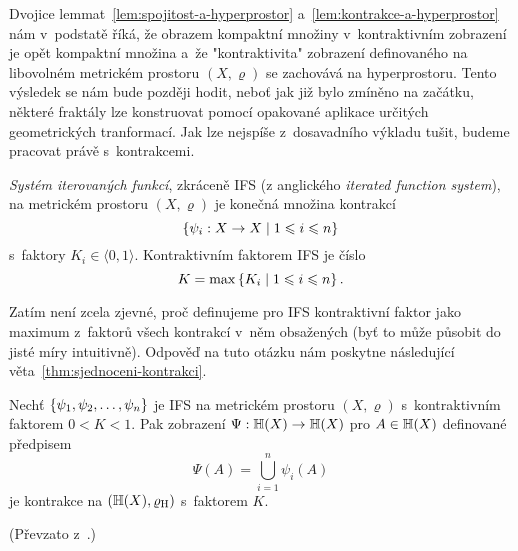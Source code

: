 Dvojice lemmat~\ref{lem:spojitost-a-hyperprostor} a~\ref{lem:kontrakce-a-hyperprostor} nám v~podstatě říká, že obrazem kompaktní množiny v~kontraktivním zobrazení je opět kompaktní množina a~že "kontraktivita" zobrazení definovaného na libovolném metrickém prostoru $(X,\varrho)$ se zachovává na hyperprostoru. Tento výsledek se nám bude později hodit, neboť jak již bylo zmíněno na začátku, některé fraktály lze konstruovat pomocí opakované aplikace určitých geometrických tranformací. Jak lze nejspíše z~dosavadního výkladu tušit, budeme pracovat právě s~kontrakcemi.
\begin{definition}\label{def:system-iterovanych-funkci}
    \emph{Systém iterovaných funkcí}, zkráceně IFS (z anglického \emph{iterated function system}), na metrickém prostoru $(X,\varrho)$ je konečná množina kontrakcí
    \[\left\{\psi_i:X \rightarrow X\mid 1\leqslant i\leqslant n\right\}\]
    s~faktory $K_i\in\langle 0,1\rangle$. Kontraktivním faktorem IFS je číslo
    \[K=\max\left\{K_i\mid 1\leqslant i\leqslant n\right\}.\]
\end{definition}
Zatím není zcela zjevné, proč definujeme pro IFS kontraktivní faktor jako maximum z~faktorů všech kontrakcí v~něm obsažených (byť to může působit do jisté míry intuitivně). Odpověď na tuto otázku nám poskytne následující věta~\ref{thm:sjednoceni-kontrakci}.
\begin{theorem}\label{thm:sjednoceni-kontrakci}
    Nechť $\left\{\psi_1,\psi_2,\ldots,\psi_n\right\}$ je IFS na metrickém prostoru $(X,\varrho)$ s~kontraktivním faktorem $0<K<1$. Pak zobrazení $\Psi:\mathbb{H}(X) \rightarrow \mathbb{H}(X)$ pro $A\in\mathbb{H}(X)$ definované předpisem
    \[\Psi(A)=\bigcup_{i=1}^n\psi_i(A)\]
    je kontrakce na $(\mathbb{H}(X),\varrho_\textup{H})$ s~faktorem $K$.
\end{theorem}
(Převzato z~\citep[str. 81]{Barnsley1993}.)
